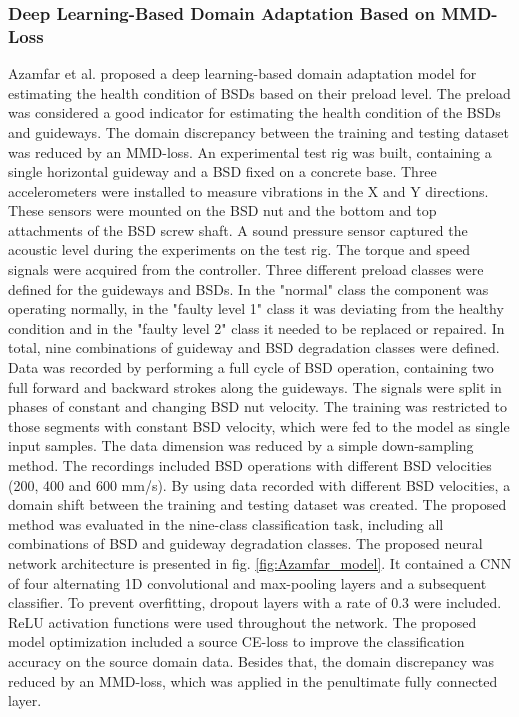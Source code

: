 \subsubsection{Deep Learning-Based Domain Adaptation Based on MMD-Loss}
Azamfar et al. \cite{AZAMFAR2020103932} proposed a deep learning-based domain adaptation model for estimating the health condition of BSDs based on their preload level. The preload was considered a good indicator for estimating the health condition of the BSDs and guideways. The domain discrepancy between the training and testing dataset was reduced by an MMD-loss. An experimental test rig was built, containing a single horizontal guideway and a BSD fixed on a concrete base. Three accelerometers were installed to measure vibrations in the X and Y directions. These sensors were mounted on the BSD nut and the bottom and top attachments of the BSD screw shaft. A sound pressure sensor captured the acoustic level during the experiments on the test rig. The torque and speed signals were acquired from the controller. Three different preload classes were defined for the guideways and BSDs. In the "normal" class the component was operating normally, in the "faulty level 1" class it was deviating from the healthy condition and in the "faulty level 2" class it needed to be replaced or repaired. In total, nine combinations of guideway and BSD degradation classes were defined. Data was recorded by performing a full cycle of BSD operation, containing two full forward and backward strokes along the guideways. The signals were split in phases of constant and changing BSD nut velocity. The training was restricted to those segments with constant BSD velocity, which were fed to the model as single input samples. The data dimension was reduced by a simple down-sampling method. The recordings included BSD operations with different BSD velocities (200, 400 and 600 mm/s). By using data recorded with different BSD velocities, a domain shift between the training and testing dataset was created. The proposed method was evaluated in the nine-class classification task, including all combinations of BSD and guideway degradation classes. The proposed neural network architecture is presented in fig. \ref{fig:Azamfar_model}. It contained a CNN of four alternating 1D convolutional and max-pooling layers and a subsequent classifier. To prevent overfitting, dropout layers with a rate of 0.3 were included. ReLU activation functions were used throughout the network. The proposed model optimization included a source CE-loss to improve the classification accuracy on the source domain data. Besides that, the domain discrepancy was reduced by an MMD-loss, which was applied in the penultimate fully connected layer. 

